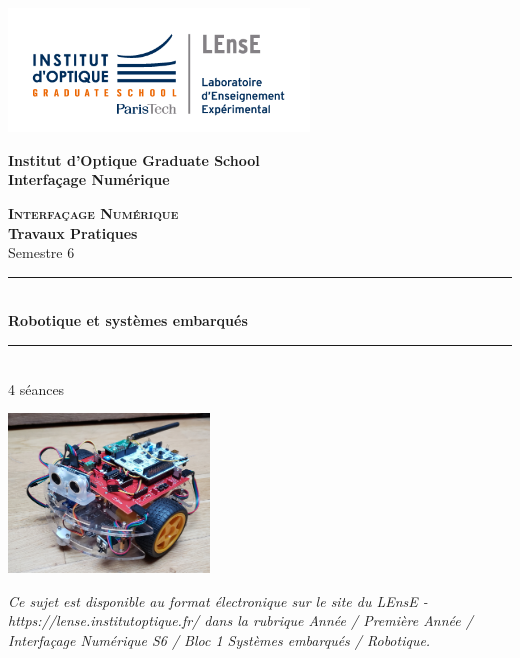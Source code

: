 \documentclass[a4paper,11pt,titlepage]{article} %
\begin{document}
\begin{titlepage}

\begin{center}
	\begin{minipage}{2.5cm}
	\begin{center}
		\includegraphics[width=8cm]{images/Logo-LEnsE.png}
	\end{center}
\end{minipage}\hfill
\begin{minipage}{10cm}
	\begin{center}
	\textbf{Institut d'Optique Graduate School }\\[0.1cm]
    \textbf{Interfaçage Numérique}


	\end{center}
\end{minipage}\hfill


\vspace{4cm}


{\huge \bfseries \textsc{Interfaçage Numérique}} \\[0.5cm]
{\large \bfseries Travaux Pratiques} \\[0.2cm]
Semestre 6

\vspace{2cm}
\rule{\linewidth}{0.3mm} \\[0.4cm]
{ \huge \bfseries\color{violet_iogs} Robotique et systèmes embarqués\\[0.4cm] }
\rule{\linewidth}{0.3mm} \\[1cm]

4 séances

\bigskip

\begin{center}
	\includegraphics[width=0.4\textwidth]{images/robot_joycar.jpg}
\end{center}

\vfill

\textit{Ce sujet est disponible au format électronique sur le site du LEnsE - https://lense.institutoptique.fr/ dans la rubrique Année / Première Année / Interfaçage Numérique S6 / Bloc 1 Systèmes embarqués / Robotique.}


\end{center}
\end{titlepage}
\end{document}
